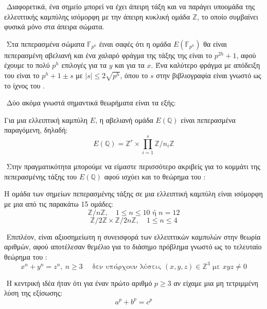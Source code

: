 \documentclass[oneside,a4paper]{article}
\begin{document}
$ $\newline
Διαφορετικά, ένα σημείο μπορεί να έχει άπειρη τάξη και να παράγει υποομάδα της ελλειπτικής καμπύλης ισόμορφη με την άπειρη κυκλική ομάδα $\mathbb{Z}$, το οποίο συμβαίνει φυσικά μόνο στα άπειρα σώματα.

$ $\newline
Στα πεπερασμένα σώματα $\mathbb{F}_{p^h}$ έιναι σαφές ότι η ομάδα $E(\mathbb{F}_{p^h})$ θα είναι πεπερασμένη αβελιανή και ένα χαλαρό φράγμα της τάξης της είναι το $p^{2h} + 1$, αφού έχουμε το πολύ $p^h$ επιλογές για τα $y$ και για τα $x$. Ένα καλύτερο φράγμα με απόδειξη του  είναι το $p^h + 1 \pm s$ με $|s| \leq 2\sqrt{p^h}$, όπου το $s$ στην βιβλιογραφία είναι γνωστό ως το ίχνος του .

$ $\newline
Δύο ακόμα γνωστά σημαντικά θεωρήματα είναι τα εξής:

\vspace*{0.1cm}
\begin{theorem}[\tl{Mordell}] Για μια ελλειπτική καμπύλη $E$, η αβελιανή ομάδα $E(\mathbb{Q})$ είναι πεπερασμένα παραγόμενη, δηλαδή:
	$$E(\mathbb{Q}) =  \mathbb{Z}^r \times \prod\limits_{i=1}^s \mathbb{Z}/n_i \mathbb{Z} $$
\end{theorem}

$ $\newline
Στην πραγματικότητα μπορούμε να είμαστε περισσότερο ακριβείς για το κομμάτι της πεπερασμένης τάξης του $E(\mathbb{Q})$ αφού ισχύει και το θεώρημα του :

\vspace*{0.1cm}
\begin{theorem}[\tl{Mazur}]
	Η ομάδα των σημείων πεπερασμένης τάξης σε μια ελλειπτική καμπύλη είναι ισόμορφη με μια από τις παρακάτω 15 ομάδες:
	$$\mathbb{Z}/n\mathbb{Z}, \quad 1\leq n \leq 10 \text{ ή } n=12$$
	$$\mathbb{Z}/2\mathbb{Z} \times \mathbb{Z}/2n \mathbb{Z}, \quad 1\leq n \leq 4$$
\end{theorem}

$ $\newline
Επιπλέον, είναι αξιοσημείωτη η συνεισφορά των ελλειπτικών καμπυλών στην θεωρία αριθμών, αφού αποτέλεσαν θεμέλιο για το διάσημο πρόβλημα γνωστό ως το τελευταίο θεώρημα του :
$$x^n + y^n = z^n, \ n\geq 3 \quad \text{ δεν υπάρχουν λύσεις } (x,y,z) \in \mathbb{Z}^3 \text{ με } xyz \neq 0$$

$ $\newline
Η κεντρική ιδέα ήταν ότι για έναν πρώτο αριθμό $p\geq 3$ αν είχαμε μια μη τετριμμένη λύση της εξίσωσης:
$$a^p + b^p = c^p$$
\end{document}

